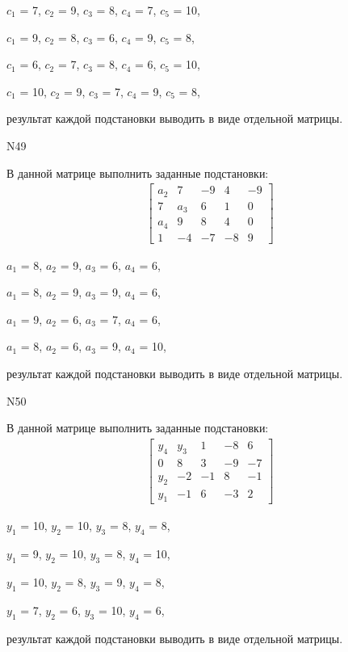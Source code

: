 \documentclass[11pt]{report}
\begin{document}
$c_{1}$ = 7, $c_{2}$ = 9, $c_{3}$ = 8, $c_{4}$ = 7, $c_{5}$ = 10, 

$c_{1}$ = 9, $c_{2}$ = 8, $c_{3}$ = 6, $c_{4}$ = 9, $c_{5}$ = 8, 

$c_{1}$ = 6, $c_{2}$ = 7, $c_{3}$ = 8, $c_{4}$ = 6, $c_{5}$ = 10, 

$c_{1}$ = 10, $c_{2}$ = 9, $c_{3}$ = 7, $c_{4}$ = 9, $c_{5}$ = 8, 

результат каждой подстановки выводить в виде отдельной матрицы.

N49

В данной матрице выполнить заданные подстановки:
\begin{align*}
\left[\begin{matrix}a_{2} & 7 & -9 & 4 & -9\\7 & a_{3} & 6 & 1 & 0\\a_{4} & 9 & 8 & 4 & 0\\1 & -4 & -7 & -8 & 9\end{matrix}\right]
\end{align*}


$a_{1}$ = 8, $a_{2}$ = 9, $a_{3}$ = 6, $a_{4}$ = 6, 

$a_{1}$ = 8, $a_{2}$ = 9, $a_{3}$ = 9, $a_{4}$ = 6, 

$a_{1}$ = 9, $a_{2}$ = 6, $a_{3}$ = 7, $a_{4}$ = 6, 

$a_{1}$ = 8, $a_{2}$ = 6, $a_{3}$ = 9, $a_{4}$ = 10, 

результат каждой подстановки выводить в виде отдельной матрицы.

N50

В данной матрице выполнить заданные подстановки:
\begin{align*}
\left[\begin{matrix}y_{4} & y_{3} & 1 & -8 & 6\\0 & 8 & 3 & -9 & -7\\y_{2} & -2 & -1 & 8 & -1\\y_{1} & -1 & 6 & -3 & 2\end{matrix}\right]
\end{align*}


$y_{1}$ = 10, $y_{2}$ = 10, $y_{3}$ = 8, $y_{4}$ = 8, 

$y_{1}$ = 9, $y_{2}$ = 10, $y_{3}$ = 8, $y_{4}$ = 10, 

$y_{1}$ = 10, $y_{2}$ = 8, $y_{3}$ = 9, $y_{4}$ = 8, 

$y_{1}$ = 7, $y_{2}$ = 6, $y_{3}$ = 10, $y_{4}$ = 6, 

результат каждой подстановки выводить в виде отдельной матрицы.
\end{document}
